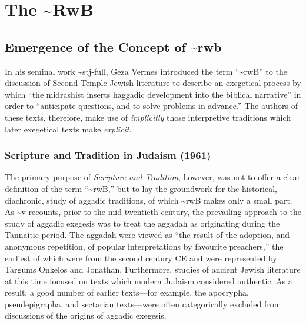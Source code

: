 \chapter{The \textasciitilde{}RwB}\label{the-rwb}

\section{Emergence of the Concept of
\textasciitilde{}rwb}\label{emergence-of-the-concept-of-rwb}

In his seminal work \textasciitilde{}stj-full, Geza Vermes introduced
the term ``\textasciitilde{}rwB'' to the discussion of Second Temple
Jewish literature to describe an exegetical process by which ``the
midrashist inserts haggadic development into the biblical narrative'' in
order to ``anticipate questions, and to solve problems in
advance.''\autocites[95]{vermes1961}[see also][]{vermes_zsengeller2014}
The authors of these texts, therefore, make use of \emph{implicitly}
those interpretive traditions which later exegetical texts make
\emph{explicit}.

\subsection{Scripture and Tradition in Judaism
(1961)}\label{scripture-and-tradition-in-judaism-1961}

The primary purpose of \emph{Scripture and Tradition}, however, was not
to offer a clear definition of the term ``\textasciitilde{}rwB,'' but to
lay the groundwork for the historical, diachronic, study of aggadic
traditions, of which \textasciitilde{}rwB makes only a small
part.\autocite[3]{vermes_zsengeller2014} As \textasciitilde{}v recounts,
prior to the mid-twentieth century, the prevailing approach to the study
of aggadic exegesis was to treat the aggadah as originating during the
Tannaitic period. The aggadah were viewed as ``the result of the
adoption, and anonymous repetition, of popular interpretations by
favourite preachers,'' \autocite[3]{vermes1961} the earliest of which
were from the second century CE and were represented by Targums Onkelos
and Jonathan. Furthermore, studies of ancient Jewish literature at this
time focused on texts which modern Judaism considered authentic. As a
result, a good number of earlier texts---for example, the apocrypha,
pseudepigrapha, and sectarian texts---were often categorically excluded
from discussions of the origins of aggadic
exegesis.\autocite[2]{vermes1961}

